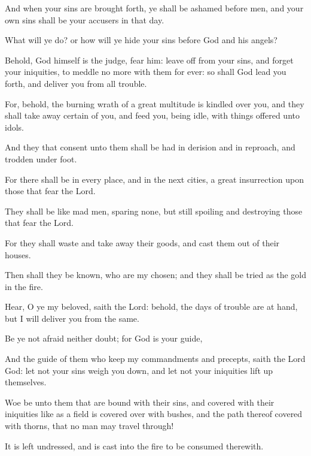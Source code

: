 {\par }{\PP {}And when your sins are brought forth, ye shall be ashamed before men, and your own sins shall be your accusers in that day.
\par }{\PP {}What will ye do? or how will ye hide your sins before God and his angels?
\par }{\PP {}Behold, God himself is the judge, fear him: leave off from your sins, and forget your iniquities, to meddle no more with them for ever: so shall God lead you forth, and deliver you from all trouble.
\par }{\PP {}For, behold, the burning wrath of a great multitude is kindled over you, and they shall take away certain of you, and feed you, being idle, with things offered unto idols.
\par }{\PP {}And they that consent unto them shall be had in derision and in reproach, and trodden under foot.
\par }{\PP {}For there shall be in every place, and in the next cities, a great insurrection upon those that fear the Lord.
\par }{\PP {}They shall be like mad men, sparing none, but still spoiling and destroying those that fear the Lord.
\par }{\PP {}For they shall waste and take away their goods, and cast them out of their houses.
\par }{\PP {}Then shall they be known, who are my chosen; and they shall be tried as the gold in the fire.
\par }{\PP {}Hear, O ye my beloved, saith the Lord: behold, the days of trouble are at hand, but I will deliver you from the same.
\par }{\PP {}Be ye not afraid neither doubt; for God is your guide,
\par }{\PP {}And the guide of them who keep my commandments and precepts, saith the Lord God: let not your sins weigh you down, and let not your iniquities lift up themselves.
\par }{\PP {}Woe be unto them that are bound with their sins, and covered with their iniquities like as a field is covered over with bushes, and the path thereof covered with thorns, that no man may travel through!
\par }{\PP {}It is left undressed, and is cast into the fire to be consumed therewith.
\par }